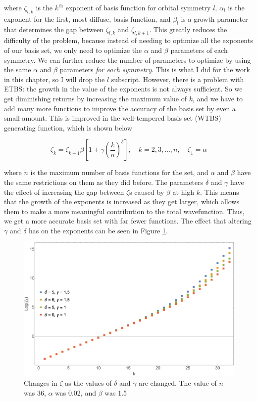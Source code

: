 where $\zeta_{l,k}$ is the $k^{\text{th}}$ exponent of basis function for orbital symmetry $l$, $\alpha_{l}$ is the exponent for the first, most diffuse, basis function, and $\beta_{l}$ is a growth parameter that determines the gap between $\zeta_{l,k}$ and $\zeta_{l,k + 1}$. This greatly reduces the difficulty of the problem, because instead of needing to optimize all the exponents of our basis set, we only need to optimize the $\alpha$ and $\beta$ parameters of each symmetry. We can further reduce the number of parameters to optimize by using the same $\alpha$ and $\beta$ parameters \textit{for each symmetry}. This is what I did for the work in this chapter, so I will drop the $l$ subscript. However, there is a problem with ETBS: the growth in the value of the exponents is not always sufficient. So we get diminishing returns by increasing the maximum value of $k$, and we have to add many more functions to improve the accuracy of the basis set by even a small amount. This is improved in the well-tempered basis set (WTBS)\cite{WTBS} generating function, which is shown below

\begin{equation}
\label{eq:WTBS_gen}
\zeta_{k} = \zeta_{k-1}\beta\left[1+\gamma\left(\frac{k}{n}\right)^{\delta}\right], \quad k = 2, 3,\ldots, n, \quad \zeta_{1}=\alpha
\end{equation}

where $n$ is the maximum number of basis functions for the set, and $\alpha$ and $\beta$ have the same restrictions on them as they did before. The parameters $\delta$ and $\gamma$ have the effect of increasing the gap between $\zeta$s caused by $\beta$ at high $k$. This means that the growth of the exponents is increased as they get larger, which allows them to make a more meaningful contribution to the total wavefunction. Thus, we get a more accurate basis set with far fewer functions. The effect that altering $\gamma$ and $\delta$ has on the exponents can be seen in Figure \ref{fig:deltagamm}.

\begin{figure}
\center
\includegraphics[width=1\textwidth]{Figures/deltagamm.png}
\caption[Changes in $\zeta$ as the values of $\delta$ and $\gamma$ are changed.]
{Changes in $\zeta$ as the values of $\delta$ and $\gamma$ are changed. The value of $n$ was 36, $\alpha$ was 0.02, and $\beta$ was 1.5}
\label{fig:deltagamm}
\end{figure}

